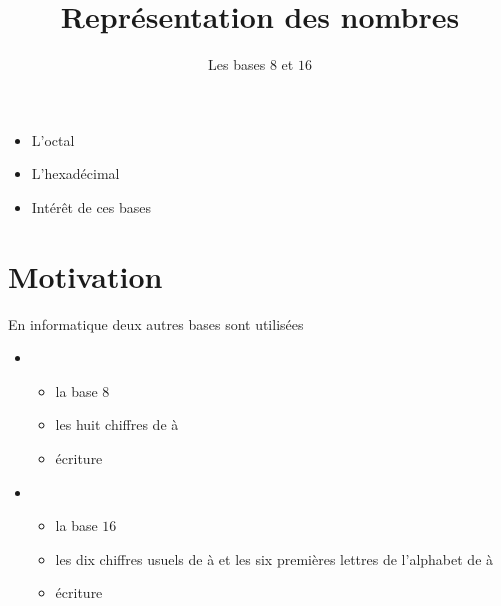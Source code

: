 \title{{\bf Représentation des nombres}}
\subtitle{Les bases $8$ et $16$}

\begin{frame}
  
  \debutmontitre

  \pause

{\footnotesize
\hfil\qquad\qquad\qquad\qquad
{}
\begin{minipage}{0.6\textwidth}
  \begin{itemize}
    \item<3-> L'octal
    \item<4-> L'hexadécimal
    \item<5-> Intérêt de ces bases
  \end{itemize}
\end{minipage}
}

\end{frame}

\setcounter{framenumber}{0}

\section{Motivation}

\begin{frame}


\pause  
\bigskip

En informatique deux autres bases sont utilisées

\begin{itemize}
\pause
\item 
\begin{itemize}
\item la base $8$
\pause
\item les huit chiffres de  à 
\pause
\item écriture 
\end{itemize}


\pause  
\item 
\begin{itemize}
\item la base $16$
\pause
\item les dix chiffres usuels de  à
   et les six premières lettres de l'alphabet de  à
\pause
\item écriture 
\end{itemize}
\end{itemize}

\end{frame}


